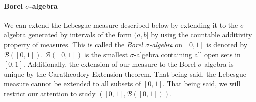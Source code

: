 \documentclass[12pt]{article}
\theoremstyle{definition}
\theoremstyle{remark}
\numberwithin{equation}{section}
\begin{document}
\paragraph{Borel $\sigma$-algebra}%
\label{par:borel_sigma_algebra}

We can extend the Lebesgue measure described below by extending it to the $\sigma$-algebra generated by intervals of the form $(a,b]$ by using the countable additivity property of measures. This is called the \emph{Borel $\sigma$-algebra} on $[0,1]$ is denoted by $\mathcal{B}([0,1])$. $\mathcal{B}([0,1])$ is the smallest $\sigma$-algebra containing all open sets in $[0,1]$. Additionally, the extension of our measure to the Borel $\sigma$-algebra is unique by the Caratheodory Extension theorem. That being said, the Lebesgue measure cannot be extended to all subsets of $[0,1]$. That being said, we will restrict our attention to study $([0,1], \mathcal{B}([0,1]))$. 
\end{document}
